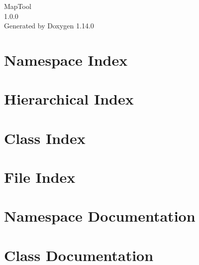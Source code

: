\documentclass[twoside]{book}
\newcommand{\+}{\discretionary{\mbox{\scriptsize$\hookleftarrow$}}{}{}}
\newcommand{\clearemptydoublepage}{%
    \newpage{\pagestyle{empty}\cleardoublepage}%
  }
\begin{document}
  \raggedbottom
    \hypersetup{pageanchor=false,
                bookmarksnumbered=true,
                pdfencoding=unicode
               }
  \begin{titlepage}
  \vspace*{7cm}
  \begin{center}%
  {\Large Map\+Tool}\\
  [1ex]\large 1.\+0.\+0 \\
  \vspace*{1cm}
  {\large Generated by Doxygen 1.14.0}\\
  \end{center}
  \end{titlepage}
  \clearemptydoublepage
  \tableofcontents
  \clearemptydoublepage
  \hypersetup{pageanchor=true}
\chapter{Namespace Index}

\chapter{Hierarchical Index}

\chapter{Class Index}

\chapter{File Index}

\chapter{Namespace Documentation}

\chapter{Class Documentation}





































\end{document}
